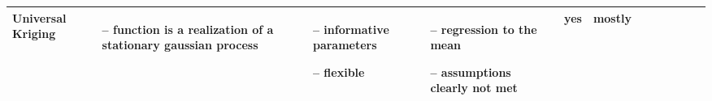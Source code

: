 \begin{table}[!ht]
\begin{tabular}{p{1.6cm}p{3.3cm}p{3.3cm}p{3.3cm}p{0.4cm}p{0.4cm}p{3cm}p{3cm}p{3cm}p{3cm}p{3cm}p{3cm}|}
		Universal Kriging                                                                                                                                            &
		\begin{cptitemize} \item[--]  function is a realization of a stationary gaussian process                                      \end{cptitemize}               &
		\begin{cptitemize} \item[--]  informative parameters \item[--]  flexible                                                             \end{cptitemize}        &
		\begin{cptitemize} \item[--]  regression to the mean \item[--]  assumptions clearly not met                                          \end{cptitemize}        &
		yes                                                                                                                                                          &
		mostly                                                                                                                                                         \\ \hline%


		\hline
	\end{tabular}
\end{table}
